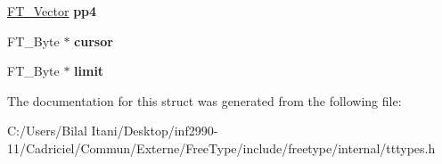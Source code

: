 \begin{DoxyCompactItemize}
\item 
\hyperlink{struct_f_t___vector__}{F\+T\+\_\+\+Vector} {\bfseries pp4}\hypertarget{struct_t_t___loader_rec___a0608203207c3fc735046b8baef4b9201}{}\label{struct_t_t___loader_rec___a0608203207c3fc735046b8baef4b9201}

\item 
F\+T\+\_\+\+Byte $\ast$ {\bfseries cursor}\hypertarget{struct_t_t___loader_rec___a6769a96f37ca22801f6199937cbe9ca7}{}\label{struct_t_t___loader_rec___a6769a96f37ca22801f6199937cbe9ca7}

\item 
F\+T\+\_\+\+Byte $\ast$ {\bfseries limit}\hypertarget{struct_t_t___loader_rec___a1b07761e8ea436c38b4c42117a00a0ff}{}\label{struct_t_t___loader_rec___a1b07761e8ea436c38b4c42117a00a0ff}

\end{DoxyCompactItemize}


The documentation for this struct was generated from the following file\+:\begin{DoxyCompactItemize}
\item 
C\+:/\+Users/\+Bilal Itani/\+Desktop/inf2990-\/11/\+Cadriciel/\+Commun/\+Externe/\+Free\+Type/include/freetype/internal/tttypes.\+h\end{DoxyCompactItemize}

